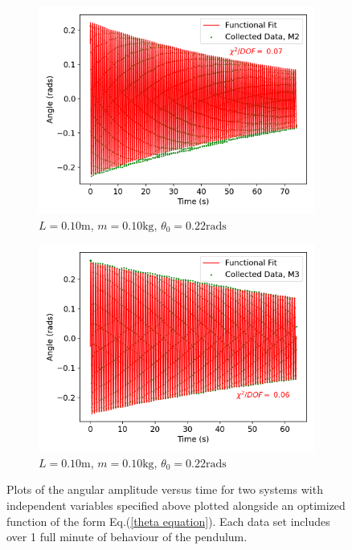 \begin{figure}[H]
\centering
\begin{subfigure}[t]{0.5\textwidth}
  \centering
  \includegraphics[width=1\textwidth]{Plots/M2.png}
  \caption{\small{$L = 0.10\text{m}$, $m = 0.10\text{kg}$, $\theta_0 = 0.22\text{rads}$}}
  \label{M2}
\end{subfigure}%
\begin{subfigure}[t]{.5\textwidth}
  \centering
  \includegraphics[width=\textwidth]{Plots/M3.png}
  \caption{\small{$L = 0.10\text{m}$, $m = 0.10\text{kg}$, $\theta_0 = 0.22\text{rads}$}}
  \label{M3}
\end{subfigure}
\caption{\small{Plots of the angular amplitude versus time for two systems with independent variables specified above plotted alongside an optimized function of the form Eq.(\ref{theta equation}). Each data set includes over 1 full minute of behaviour of the pendulum.}}
\end{figure}

